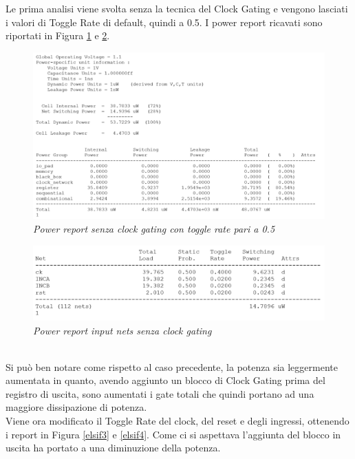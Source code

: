 Le prima analisi viene svolta senza la tecnica del Clock Gating e vengono lasciati i valori di Toggle Rate di default, quindi a 0.5. I power report ricavati sono riportati in Figura \ref{elsif1} e \ref{elsif2}.
\begin{figure}[!htb]
	\centering
	\includegraphics[scale=0.65]{immagini/elsif1}
	\caption{\textit{Power report senza clock gating con toggle rate pari a 0.5}}
	\label{elsif1}
\end{figure}
\begin{figure}[!htb]
	\centering
	\includegraphics[scale=0.65]{immagini/elsif2}
	\caption{\textit{Power report input nets senza clock gating}}
	\label{elsif2}
\end{figure}
\\
Si può ben notare come rispetto al caso precedente, la potenza sia leggermente aumentata in quanto, avendo aggiunto un blocco di Clock Gating prima del registro di uscita, sono aumentati i gate totali che quindi portano ad una maggiore dissipazione di potenza. \\
Viene ora modificato il Toggle Rate del clock, del reset e degli ingressi, ottenendo i report in Figura \ref{elsif3} e \ref{elsif4}. Come ci si aspettava l'aggiunta del blocco in uscita ha portato a una diminuzione della potenza. \\
